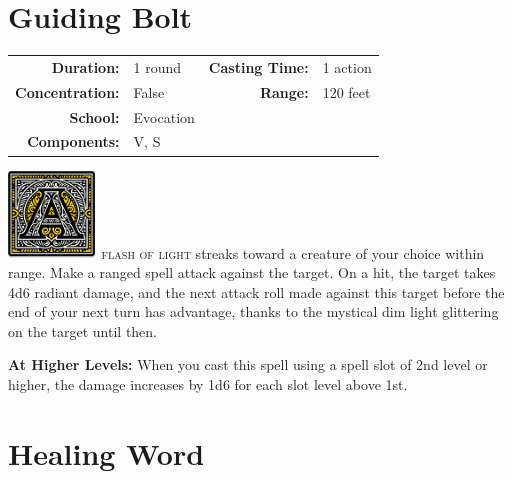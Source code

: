 \documentclass[12pt,showtrims]{memoir}
\begin{document}
\newpage
{}
\newpage
\section*{Guiding Bolt}

{
\small\centering\vspace{-6pt}
\begin{tabular}{rlrl}
\toprule

\textbf{Duration:} & 1 round &
\textbf{Casting Time:} & 1 action \\
\textbf{Concentration:} & False &
\textbf{Range:} & 120 feet \\
\textbf{School:} & Evocation \\
\textbf{Components:} & \multicolumn{3}{p{0.7\textwidth}}{V, S}\\

\bottomrule
\end{tabular}
}

\vspace{1\baselineskip}\noindent
\lettrine[lines=4]{\includegraphics[height=66pt]{initials/A.png}}{\ flash of light} streaks toward a creature of your choice within range. Make a ranged spell attack against the target. On a hit, the target takes 4d6 radiant damage, and the next attack roll made against this target before the end of your next turn has advantage, thanks to the mystical dim light glittering on the target until then.

\vspace{8pt} \noindent\textbf{At Higher Levels:} When you cast this spell using a spell slot of 2nd level or higher, the damage increases by 1d6 for each slot level above 1st.
\newpage
{}
\newpage
\section*{Healing Word}
\end{document}

